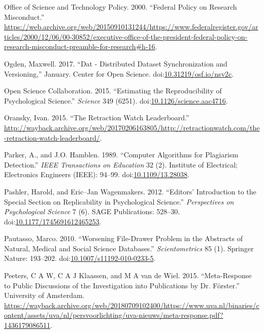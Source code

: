 \documentclass[a5paper]{book}
\begin{document}
\hypertarget{ref-ostp2000}{}
Office of Science and Technology Policy. 2000. ``Federal Policy on
Research Misconduct.''
\url{https://web.archive.org/web/20150910131244/https://www.federalregister.gov/articles/2000/12/06/00-30852/executive-office-of-the-president-federal-policy-on-research-misconduct-preamble-for-research\#h-16}.

\hypertarget{ref-doi:10.31219ux2fosf.ioux2fnsv2c}{}
Ogden, Maxwell. 2017. ``Dat - Distributed Dataset Synchronization and
Versioning,'' January. Center for Open Science.
doi:\href{https://doi.org/10.31219/osf.io/nsv2c}{10.31219/osf.io/nsv2c}.

\hypertarget{ref-doi:10.1126ux2fscience.aac4716}{}
Open Science Collaboration. 2015. ``Estimating the Reproducibility of
Psychological Science.'' \emph{Science} 349 (6251).
doi:\href{https://doi.org/10.1126/science.aac4716}{10.1126/science.aac4716}.

\hypertarget{ref-oransky2015}{}
Oransky, Ivan. 2015. ``The Retraction Watch Leaderboard.''
\url{http://wayback.archive.org/web/20170206163805/http://retractionwatch.com/the-retraction-watch-leaderboard/}.

\hypertarget{ref-doi:10.1109ux2f13.28038}{}
Parker, A., and J.O. Hamblen. 1989. ``Computer Algorithms for Plagiarism
Detection.'' \emph{IEEE Transactions on Education} 32 (2). Institute of
Electrical; Electronics Engineers (IEEE): 94--99.
doi:\href{https://doi.org/10.1109/13.28038}{10.1109/13.28038}.

\hypertarget{ref-doi:10.1177ux2f1745691612465253}{}
Pashler, Harold, and Eric--Jan Wagenmakers. 2012. ``Editors'
Introduction to the Special Section on Replicability in Psychological
Science.'' \emph{Perspectives on Psychological Science} 7 (6). SAGE
Publications: 528--30.
doi:\href{https://doi.org/10.1177/1745691612465253}{10.1177/1745691612465253}.

\hypertarget{ref-doi:10.1007ux2fs11192-010-0233-5}{}
Pautasso, Marco. 2010. ``Worsening File-Drawer Problem in the Abstracts
of Natural, Medical and Social Science Databases.''
\emph{Scientometrics} 85 (1). Springer Nature: 193--202.
doi:\href{https://doi.org/10.1007/s11192-010-0233-5}{10.1007/s11192-010-0233-5}.

\hypertarget{ref-peeters2015}{}
Peeters, C A W, C A J Klaassen, and M A van de Wiel. 2015.
``Meta-Response to Public Discussions of the Investigation into
Publications by Dr. Förster.'' University of Amsterdam.
\url{https://wayback.archive.org/web/20180709102400/https://www.uva.nl/binaries/content/assets/uva/nl/persvoorlichting/uva-nieuws/meta-response.pdf?1436179086511}.
\end{document}

